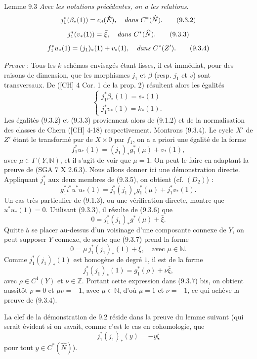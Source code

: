 \begin{statement}{Lemme 9.3}
\emph{Avec les notations précédentes, on a les relations}.
\[
j_1^*(\beta_*(1))=c_d(\check E),\quad\text{\emph{dans} }C^*(\widehat N).
\tag{9.3.2}
\]
\[
j_1^*(v_*(1))=\bar\xi,\quad\text{\emph{dans} }C^*(\widehat N).
\tag{9.3.3}
\]
\[
f_1^*u_*(1)=(j_1)_*(1)+v_*(1),\quad\text{\emph{dans} }C^*(Z').
\tag{9.3.4}
\]
\end{statement}

\emph{Preuve} : Tous les $k$-schémas envisagés étant lisses, il est immédiat, pour des raisons de dimension, que les morphismes $j_1$ et $\beta$ (resp. $j_1$ et $v$) sont transversaux. De ([CH] 4 Cor. 1 de la prop. 2) résultent alors les égalités
\[
\begin{cases}
j_1^*\beta_*(1)=s_*(1)\\
j_1^*v_*(1)=k_*(1).
\end{cases}
\]
Les égalités (9.3.2) et (9.3.3) proviennent alors de (9.1.2) et de la normalisation des classes de Chern ([CH] 4-18) respectivement. Montrons (9.3.4). Le cycle $X'$ de $Z'$ étant le transformé pur de $X\times0$ par $f_1$, on a a priori une égalité de la forme
\[
f_1^*u_*(1)=(j_1)_*g_1^*(\mu)+v_*(1),
\tag{9.3.5}
\]
avec $\mu\in\Gamma(Y,\mathbb{N})$, et il s'agit de voir que $\mu=1$. On peut le faire en adaptant la preuve de (SGA 7 X 2.6.3). Nous allons donner ici une démonstration directe. Appliquant $j_1^*$ aux deux membres de (9.3.5), on obtient (cf. $(D_2)$) :
\[
g_1^*i^*u^*u_*(1)=j_1^*(j_1)_*g_1^*(\mu)+j_1^*v_*(1).
\tag{9.3.6}
\]
Un cas très particulier de (9.1.3), ou une vérification directe, montre que $u^*u_*(1)=0$. Utilisant (9.3.3), il résulte de (9.3.6) que
\[
0=j_1^*(j_1)_*g^*(\mu)+\bar\xi.
\tag{9.3.7}
\]
Quitte à se placer au-dessus d'un voisinage d'une composante connexe de $Y$, on peut supposer $Y$ connexe, de sorte que (9.3.7) prend la forme
\[
0=\mu\,j_1^*(j_1)_*(1)+\bar\xi,\quad\text{avec }\mu\in\mathbb{N}.
\tag*{(9.3.7) bis}
\]
Comme $j_1^*(j_1)_*(1)$ est homogène de degré $1$, il est de la forme
\[
j_1^*(j_1)_*(1)=g_1^*(\rho)+\nu\bar\xi,
\]
avec $\rho\in C^1(Y)$ et $\nu\in\mathbb{Z}$. Portant cette expression dans (9.3.7) bis, on obtient aussitôt $\rho=0$ et $\mu\nu=-1$, avec $\mu\in\mathbb{N}$, d'où $\mu=1$ et $\nu=-1$, ce qui achève la preuve de (9.3.4).

La clef de la démonstration de 9.2 réside dans la preuve du lemme suivant (qui serait évident si on savait, comme c'est le cas en cohomologie, que
\[
j_1^*(j_1)_*(y)=-y\bar\xi
\]
pour tout $y\in C^*(\widehat N)$).

